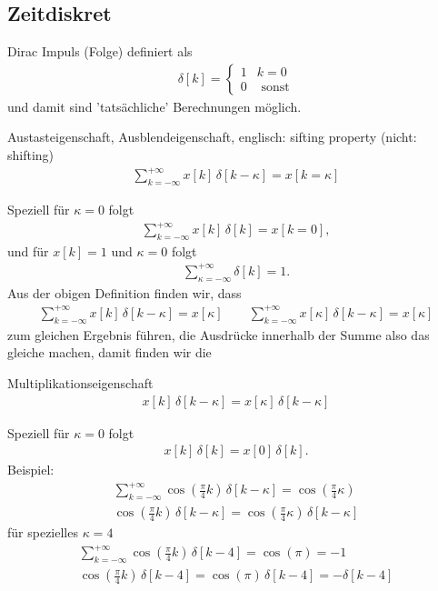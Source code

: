 \subsection{Zeitdiskret}
Dirac Impuls (Folge) definiert als
\begin{align}
\delta[k] =
\begin{cases}
1 & k=0\\
0 & \text{ sonst}
\end{cases}
\end{align}
und damit sind 'tatsächliche' Berechnungen möglich.
\begin{mdframed}
Austasteigenschaft, Ausblendeigenschaft, englisch: sifting property (nicht: shifting)
\begin{align}
\sum\limits_{k=-\infty}^{+\infty} x[k] \, \delta[k-\kappa] = x[k=\kappa]
\label{eq:AppA_SifitingDT}
\end{align}
\end{mdframed}
Speziell für $\kappa=0$ folgt
\begin{align}
\sum\limits_{k=-\infty}^{+\infty} x[k] \, \delta[k] = x[k=0],
\end{align}
und für $x[k]=1$ und $\kappa=0$ folgt
\begin{align}
\sum\limits_{\kappa=-\infty}^{+\infty} \delta[k] = 1.
\end{align}
Aus der obigen Definition finden wir, dass
\begin{align}
\sum\limits_{k=-\infty}^{+\infty} x[k] \, \delta[k-\kappa] = x[\kappa]\qquad
\sum\limits_{k=-\infty}^{+\infty} x[\kappa] \, \delta[k-\kappa] = x[\kappa]
\end{align}
zum gleichen Ergebnis führen, die Ausdrücke innerhalb der Summe also das gleiche
machen, damit finden wir die
\begin{mdframed}
Multiplikationseigenschaft
\begin{align}
x[k] \, \delta[k-\kappa] = x[\kappa] \, \delta[k-\kappa]
\end{align}
\end{mdframed}
Speziell für $\kappa=0$ folgt
\begin{align}
x[k] \, \delta[k] = x[0] \, \delta[k].
\end{align}
%
Beispiel:
\begin{align}
\sum\limits_{k=-\infty}^{+\infty} \cos(\frac{\pi}{4} k) \, \delta[k-\kappa] =\cos(\frac{\pi}{4} \kappa)\\
\cos(\frac{\pi}{4} k) \, \delta[k-\kappa] = \cos(\frac{\pi}{4} \kappa) \, \delta[k-\kappa]
\end{align}
für spezielles $\kappa=4$
\begin{align}
\sum\limits_{k=-\infty}^{+\infty} \cos(\frac{\pi}{4} k) \, \delta[k-4] =\cos(\pi) = -1\\
\cos(\frac{\pi}{4} k) \, \delta[k-4] = \cos(\pi) \, \delta[k-4] = -\delta[k-4]
\end{align}

